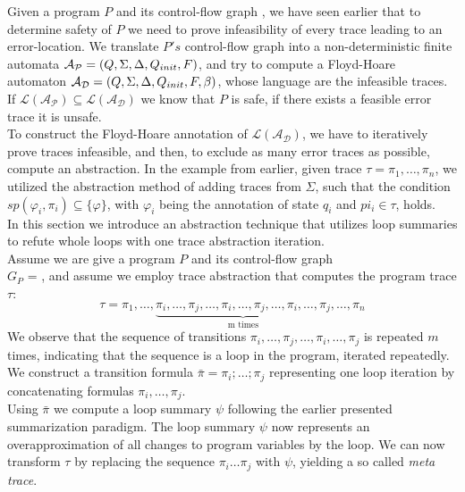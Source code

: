 
Given a program $P$ and its control-flow graph \cfg, we have seen earlier that to determine safety of $P$ we need to prove infeasibility of every trace leading to an error-location. We translate $P's$ control-flow graph into a non-deterministic finite automata $\mathcal{A_{P}} = (Q, \Sigma, \Delta, Q_{init}, F)$, and try to compute a Floyd-Hoare automaton $\mathcal{A_{D}} = (Q, \Sigma, \Delta, Q_{init}, F, \beta)$, whose language are the infeasible traces. If $\mathcal{L(A_P)} \subseteq \mathcal{L(A_D)}$ we know that $P$ is safe, if there exists a feasible error trace it is unsafe. \\ To construct the Floyd-Hoare annotation of $\mathcal{L(A_D)}$, we have to iteratively prove traces infeasible, and then, to exclude as many error traces as possible, compute an abstraction. In the example from earlier, given trace $\tau = \pi_1, \ldots, \pi_n$, we utilized the abstraction method of adding traces from $\Sigma$, such that the condition $sp(\varphi_i, \pi_i) \subseteq \{\varphi\}$, with $\varphi_i$ being the annotation of state $q_i$ and $pi_i \in \tau$, holds. \\
In this section we introduce an abstraction technique that utilizes loop summaries to refute whole loops with one trace abstraction iteration. \\

Assume we are give a program $P$ and its control-flow graph \\ $G_P$ = \cfg, and assume we employ trace abstraction that computes the program trace $\tau$:
\begin{equation*}
	\tau = \pi_1, \ldots, \underbrace{\pi_i, \ldots, \pi_j, \ldots, \pi_i, \ldots, \pi_j, \ldots, \pi_i, \ldots, \pi_j}_{\text{m times}}, \ldots, \pi_n
\end{equation*}
We observe that the sequence of transitions $\pi_i, \ldots, \pi_j, \ldots, \pi_i, \ldots, \pi_j$ is repeated $m$ times, indicating that the sequence is a loop in the program, iterated repeatedly. We construct a transition formula $\bar{\pi} = \pi_i; \ldots; \pi_j$ representing one loop iteration by concatenating formulas $\pi_i, \ldots, \pi_j$. \\
Using $\bar{\pi}$ we compute a \qvasr loop summary $\psi$ following the earlier presented summarization paradigm. The loop summary $\psi$ now represents an overapproximation of all changes to program variables by the loop. We can now transform $\tau$ by replacing the sequence $\pi_i \ldots \pi_j$ with $\psi$, yielding a so called \textsl{meta trace}.

